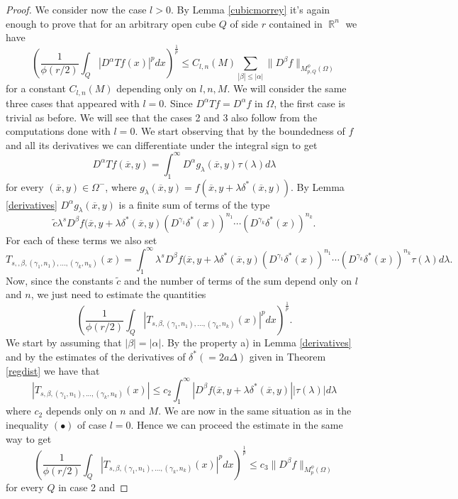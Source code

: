 \documentclass[12pt]{article}
\theoremstyle{definition}
\DeclareMathOperator\rr{\mathbb{R}}
\begin{document}
\begin{proof}
We consider now the case $l>0.$ By Lemma \ref{cubicmorrey} it's again enough to prove that for an arbitrary open cube $Q$ of side $r$ contained in $\rr^n$ we have
\begin{equation}
\left(\frac{1}{\phi(r/2)}\int_Q |D^\alpha Tf(x)|^pdx \right)^{\frac{1}{p}} \le C_{l,n}(M) \sum_{|\beta| \le |\alpha|}\| D^\beta f\|_{M_{p,Q}^\phi(\Omega)}
\end{equation}
for a constant $C_{l,n}(M)$ depending only on $l,n,M$. We will consider the same three cases that appeared with $l=0$. Since $D^\alpha Tf=D^\alpha f$ in $\Omega$, the first case is trivial as before. We will see that the cases 2 and 3 also follow from the computations done with $l=0$. We start observing that by the boundedness of $f$ and all its derivatives we can differentiate under the integral sign to get
\[D^\alpha Tf(\overline x,y)= \int_1^\infty D^\alpha g_\lambda(\overline x,y) \tau(\lambda) d\lambda\]
for every $(\overline x, y) \in \Omega^-$, where $g_\lambda(\overline x,y)=f(\overline x, y+\lambda \delta^*(\overline x, y))$. By Lemma \ref{derivatives} $D^\alpha g_\lambda(\overline x,y)$ is a finite sum of terms of the type 
\[ \widetilde c\lambda ^s D^\beta f(\overline x, y+\lambda \delta^*(\overline x, y)(D^{\gamma_1}\delta^*(x))^{n_1}\cdots (D^{\gamma_k}\delta^*(x))^{n_k}.\]
For each of these terms we also set
\[ T_{s,,\beta,(\gamma_1,n_1),...,(\gamma_k,n_k)}(x) = \int_1^\infty \lambda ^s D^\beta f(\overline x, y+\lambda \delta^*(\overline x, y)(D^{\gamma_1}\delta^*(x))^{n_1}\cdots (D^{\gamma_k}\delta^*(x))^{n_k} \tau(\lambda) d\lambda.\]
Now, since the constants $\widetilde c$ and the number of terms of the sum depend only on $l$ and $n$, we just need to estimate the quantities
\[\left( \frac{1}{\phi(r/2)}\int_Q  \left| T_{s,\beta,(\gamma_1,n_1),...,(\gamma_k,n_k)}(x)\right|^p dx\right )^{\frac{1}{p}}.\]
We start by assuming that $|\beta|=|\alpha|.$ By the property a) in Lemma \ref{derivatives} and by the estimates of the derivatives of $\delta^*(=2a\Delta)$ given in Theorem \ref{regdist} we have that
\[ |T_{s,\beta,(\gamma_1,n_1),...,(\gamma_k,n_k)}(x) | 
\le c_2 \int_1^\infty |D^\beta f(\overline x, y+\lambda \delta^*(\overline x, y)| |\tau(\lambda)|d\lambda \]
where $c_2$ depends only on $n$ and $M.$ We are now in the same situation as in the inequality $(\bullet)$ of case $l=0$. Hence we can proceed the estimate in the same way to get 
\[\left( \frac{1}{\phi(r/2)}\int_Q  \left| T_{s,\beta,(\gamma_1,n_1),...,(\gamma_k,n_k)}(x)\right|^p dx\right )^{\frac{1}{p}} \le c_3 \| D^\beta f \|_{M_p^\phi(\Omega)} \] 
for every $Q$ in case 2 and

\end{proof}
\end{document}
